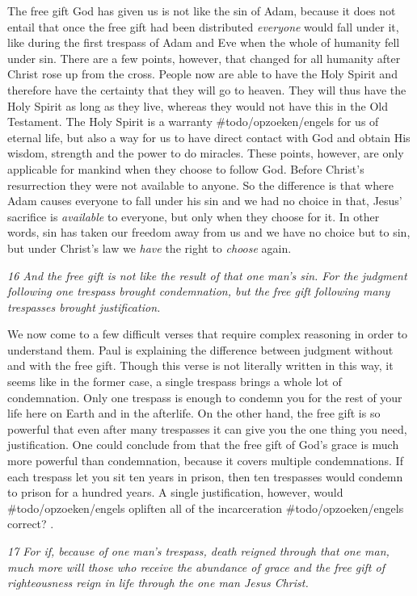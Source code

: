 The free gift God has given us is not like the sin of Adam, because it
does not entail that once the free gift had been distributed
\emph{everyone} would fall under it, like during the first trespass of
Adam and Eve when the whole of humanity fell under sin. There are a few
points, however, that changed for all humanity after Christ rose up from
the cross. People now are able to have the Holy Spirit and therefore
have the certainty that they will go to heaven. They will thus have the
Holy Spirit as long as they live, whereas they would not have this in
the Old Testament. The Holy Spirit is a warranty \#todo/opzoeken/engels
for us of eternal life, but also a way for us to have direct contact
with God and obtain His wisdom, strength and the power to do miracles.
These points, however, are only applicable for mankind when they choose
to follow God. Before Christ's resurrection they were not available to
anyone. So the difference is that where Adam causes everyone to fall
under his sin and we had no choice in that, Jesus' sacrifice is
\emph{available} to everyone, but only when they choose for it. In other
words, sin has taken our freedom away from us and we have no choice but
to sin, but under Christ's law we \emph{have} the right to \emph{choose}
again.

\emph{16 And the free gift is not like the result of that one man's sin.
For the judgment following one trespass brought condemnation, but the
free gift following many trespasses brought justification.}

We now come to a few difficult verses that require complex reasoning in
order to understand them. Paul is explaining the difference between
judgment without and with the free gift. Though this verse is not
literally written in this way, it seems like in the former case, a
single trespass brings a whole lot of condemnation. Only one trespass is
enough to condemn you for the rest of your life here on Earth and in the
afterlife. On the other hand, the free gift is so powerful that even
after many trespasses it can give you the one thing you need,
justification. One could conclude from that the free gift of God's grace
is much more powerful than condemnation, because it covers multiple
condemnations. If each trespass let you sit ten years in prison, then
ten trespasses would condemn to prison for a hundred years. A single
justification, however, would \#todo/opzoeken/engels opliften all of the
incarceration \#todo/opzoeken/engels correct? .

\emph{17 For if, because of one man's trespass, death reigned through
that one man, much more will those who receive the abundance of grace
and the free gift of righteousness reign in life through the one man
Jesus Christ.}


